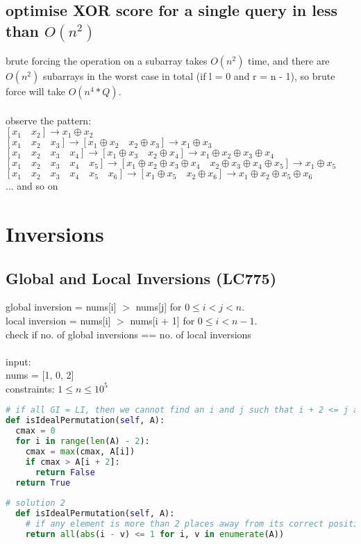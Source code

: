\documentclass[11pt]{article}
\begin{document}
\subsection{optimise XOR score for a single query in less than $O(n^{2})$}
brute forcing the operation on a subarray takes $O(n^{2})$ time, and there are $O(n^{2})$ subarrays in the worst case in total (if l = 0 and r = n - 1), so brute force will take $O(n^{4} * Q)$. \\\;\\
observe the pattern: \\
$[x_{1}\quad x_{2}] \rightarrow x_{1} \oplus x_{2}$  \\
$[x_{1}\quad x_{2}\quad x_{3}]\rightarrow [x_{1}\oplus x_{2}\quad x_{2}\oplus x_{3}]\rightarrow x_{1}\oplus x_{3}$ \\
$[x_{1}\quad x_{2}\quad x_{3}\quad x_{4}]\rightarrow [x_{1}\oplus x_{3}\quad x_{2}\oplus x_{4}]\rightarrow x_{1}\oplus x_{2}\oplus x_{3}\oplus x_{4}$\\
$[x_{1}\quad x_{2}\quad x_{3}\quad x_{4}\quad x_{5}]\rightarrow [x_{1}\oplus x_{2}\oplus x_{3}\oplus x_{4}\quad x_{2}\oplus x_{3}\oplus x_{4}\oplus x_{5}]\rightarrow x_{1}\oplus x_{5}$\\
$[x_{1}\quad x_{2}\quad x_{3}\quad x_{4}\quad x_{5}\quad x_{6}]\rightarrow [x_{1}\oplus x_{5} \quad x_{2} \oplus x_{6}]\rightarrow x_{1}\oplus x_{2}\oplus x_{5}\oplus x_{6}$\\
... and so on 





\section{Inversions}

\subsection{Global and Local Inversions (LC775)}
global inversion = nums[i] $>$ nums[j] for $0 \leq i < j < n$. \\
local inversion = nums[i] $>$ nums[i + 1] for $0 \leq i < n - 1$.\\
check if no. of global inversions == no. of local inversions\\\;\\
input: \\
nums = [1, 0, 2]\\
constraints: $1 \leq n \leq 10^{5}$
\begin{lstlisting}[language=Python]
# if all GI = LI, then we cannot find an i and j such that i + 2 <= j and A[i] > A[j]
def isIdealPermutation(self, A):
  cmax = 0
  for i in range(len(A) - 2):
    cmax = max(cmax, A[i])
    if cmax > A[i + 2]:
      return False
  return True
  
# solution 2
  def isIdealPermutation(self, A):
    # if any element is more than 2 places away from its correct position
    return all(abs(i - v) <= 1 for i, v in enumerate(A))
\end{lstlisting}
\end{document}
